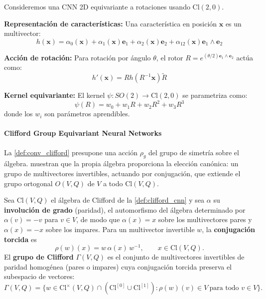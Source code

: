 \begin{example}\label{ex:steerable_clifford}
Consideremos una CNN 2D equivariante a rotaciones usando $\text{Cl}(2,0)$.

\textbf{Representación de características:}
Una característica en posición $\mathbf{x}$ es un multivector:
\[h(\mathbf{x}) = \alpha_0(\mathbf{x}) + \alpha_1(\mathbf{x}) \mathbf{e}_1 + \alpha_2(\mathbf{x}) \mathbf{e}_2 + \alpha_{12}(\mathbf{x}) \mathbf{e}_1 \wedge \mathbf{e}_2\]

\textbf{Acción de rotación:}
Para rotación por ángulo $\theta$, el rotor $R = e^{(\theta/2)\mathbf{e}_1 \wedge \mathbf{e}_2}$ actúa como:
\[h'(\mathbf{x}) = R h(R^{-1} \mathbf{x}) \widetilde{R}\]

\textbf{Kernel equivariante:}
El kernel $\psi: SO(2) \to \text{Cl}(2,0)$ se parametriza como:
\[\psi(R) = w_0 + w_1 R + w_2 R^2 + w_3 R^3\]
donde los $w_i$ son parámetros aprendibles.
\end{example}

\paragraph{Clifford Group Equivariant Neural Networks}

La \autoref{def:conv_clifford} presupone una acción $\rho_g$ del grupo de simetría sobre el álgebra. \citet{ruhe2023cliffordgroup} muestran que la propia álgebra proporciona la elección canónica: un grupo de multivectores invertibles, actuando por conjugación, que extiende el grupo ortogonal $O(V,Q)$ de $V$ a todo $\text{Cl}(V,Q)$.

\begin{definition}\label{def:grupo_clifford}
Sea $\text{Cl}(V,Q)$ el álgebra de Clifford de la \autoref{def:clifford_cnn} y sea $\alpha$ su \textbf{involución de grado} (paridad), el automorfismo del álgebra determinado por $\alpha(v) = -v$ para $v \in V$, de modo que $\alpha(x) = x$ sobre los multivectores pares y $\alpha(x) = -x$ sobre los impares. Para un multivector invertible $w$, la \textbf{conjugación torcida} es
\[\rho(w)(x) = w \, \alpha(x) \, w^{-1}, \qquad x \in \text{Cl}(V,Q).\]
El \textbf{grupo de Clifford} $\Gamma(V,Q)$ es el conjunto de multivectores invertibles de paridad homogénea (pares o impares) cuya conjugación torcida preserva el subespacio de vectores:
\[\Gamma(V,Q) = \big\{ w \in \text{Cl}^\times(V,Q) \cap (\text{Cl}^{[0]} \cup \text{Cl}^{[1]}) : \rho(w)(v) \in V \ \text{para todo } v \in V \big\}.\]
\end{definition}

